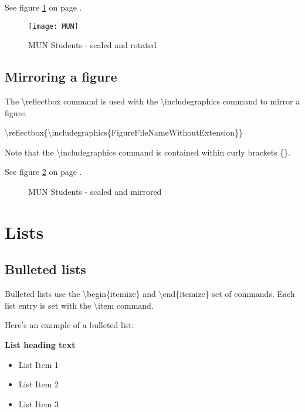 \documentclass[12pt]{MUNThesisBibTeX}
\begin{document}
See figure \ref{MUNRotated} on page \pageref{MUNRotated}.\medskip

\begin{figure}
\begin{center}
\texttt{[image: MUN]}
\caption{MUN Students - scaled and rotated}
\label{MUNRotated}
\end{center}
\end{figure}

\subsection{Mirroring a figure}
The \textbackslash reflectbox command is used with the \textbackslash includegraphics command to mirror a figure.\medskip

\textbackslash reflectbox\{\textbackslash includegraphics\{FigureFileNameWithoutExtension\}\}\medskip

Note that the \textbackslash includegraphics command is contained within curly brackets \{\}.\medskip

See figure \ref{MUNMirror} on page \pageref{MUNMirror}.\medskip

\begin{figure}
\begin{center}
\caption{MUN Students - scaled and mirrored}
\label{MUNMirror}
\end{center}
\end{figure}


\section{Lists}
\subsection{Bulleted lists}

Bulleted lists use the \textbackslash begin\{itemize\} and \textbackslash end\{itemize\} set of commands. Each list entry is set with the \textbackslash item command.

Here's an example of a bulleted list:

\smallskip
\textbf{List heading text}
\begin{itemize}
\item List Item 1
\item List Item 2
\item List Item 3
\end{itemize}
\end{document}
